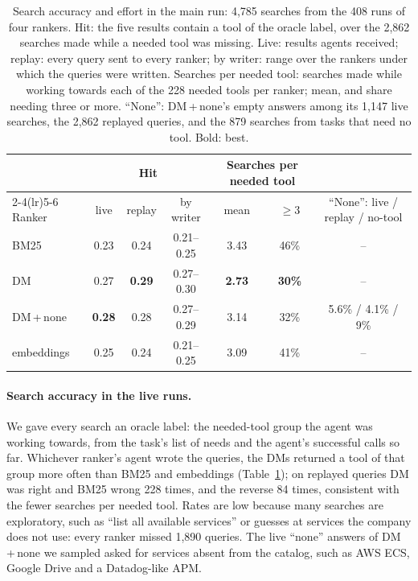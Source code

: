 \documentclass[11pt]{article}
\newcommand{\dmn}{DM\,+\,none}
\begin{document}
\begin{table}[t]
\centering\footnotesize
\caption{Search accuracy and effort in the main run: 4{,}785 searches from the 408 runs of four rankers. Hit: the
five results contain a tool of the oracle label, over the 2{,}862 searches made while a needed tool was missing.
Live: results agents received; replay: every query sent to every ranker; by writer: range over the rankers under
which the queries were written. Searches per needed tool: searches made while working towards each of the 228
needed tools per ranker; mean, and share needing three or more. ``None'': \dmn{}'s empty answers among its
1{,}147 live searches, the 2{,}862 replayed queries, and the 879 searches from tasks that need no tool. Bold:
best.}
\label{tab:replay}
\setlength{\tabcolsep}{5pt}
\begin{tabular}{@{}lcccccc@{}}
\toprule
& \multicolumn{3}{c}{Hit} & \multicolumn{2}{c}{Searches per needed tool} & \\
\cmidrule(lr){2-4}\cmidrule(lr){5-6}
Ranker & live & replay & by writer & mean & $\ge$3 & ``None'': live / replay / no-tool \\
\midrule
BM25 & 0.23 & 0.24 & 0.21--0.25 & 3.43 & 46\% & -- \\
DM & 0.27 & \textbf{0.29} & 0.27--0.30 & \textbf{2.73} & \textbf{30\%} & -- \\
\dmn{} & \textbf{0.28} & 0.28 & 0.27--0.29 & 3.14 & 32\% & 5.6\% / 4.1\% / 9\% \\
embeddings & 0.25 & 0.24 & 0.21--0.25 & 3.09 & 41\% & -- \\
\bottomrule
\end{tabular}
\end{table}

\paragraph{Search accuracy in the live runs.} We gave every search an oracle label: the needed-tool group the agent
was working towards, from the task's list of needs and the agent's successful calls so far. Whichever ranker's
agent wrote the queries, the DMs returned a tool of that group more often than BM25 and embeddings
(Table~\ref{tab:replay}); on replayed queries DM was right and BM25 wrong 228 times, and the reverse 84 times,
consistent with the fewer searches per needed tool. Rates are low because many searches are exploratory, such as
``list all available services'' or guesses at services the company does not use: every ranker missed 1{,}890
queries. The live ``none'' answers of \dmn{} we sampled asked for services absent from the catalog, such as AWS
ECS, Google Drive and a Datadog-like APM.
\end{document}
